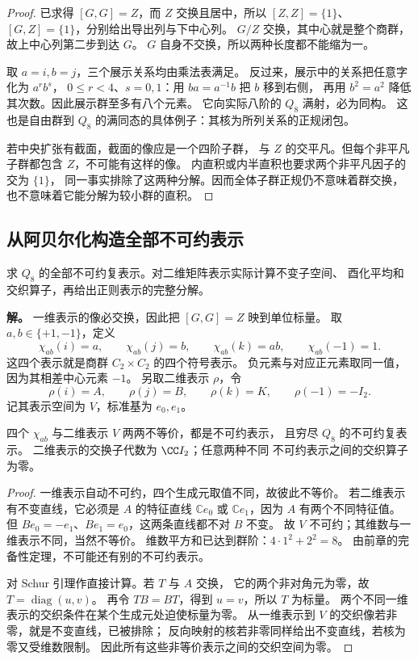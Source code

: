 \begin{proof}
已求得 $[G,G]=Z$，而 $Z$ 交换且居中，所以
$[Z,Z]=\{1\}$、$[G,Z]=\{1\}$，分别给出导出列与下中心列。
$G/Z$ 交换，其中心就是整个商群，故上中心列第二步到达 $G$。
$G$ 自身不交换，所以两种长度都不能缩为一。

取 $a=i,b=j$，三个展示关系均由乘法表满足。
反过来，展示中的关系把任意字化为 $a^r b^s$，
$0\le r<4$、$s=0,1$：用 $ba=a^{-1}b$ 把 $b$ 移到右侧，
再用 $b^2=a^2$ 降低其次数。因此展示群至多有八个元素。
它向实际八阶的 $Q_8$ 满射，必为同构。
这也是自由群到 $Q_8$ 的满同态的具体例子：其核为所列关系的正规闭包。

若中央扩张有截面，截面的像应是一个四阶子群，
与 $Z$ 的交平凡。但每个非平凡子群都包含 $Z$，不可能有这样的像。
内直积或内半直积也要求两个非平凡因子的交为 $\{1\}$，
同一事实排除了这两种分解。因而全体子群正规仍不意味着群交换，
也不意味着它能分解为较小群的直积。
\end{proof}

\subsection{从阿贝尔化构造全部不可约表示}

\begin{exbox}[把抽象乘法变成态空间上的矩阵]
求 $Q_8$ 的全部不可约复表示。对二维矩阵表示实际计算不变子空间、
酉化平均和交织算子，再给出正则表示的完整分解。
\end{exbox}

\textbf{解。} 一维表示的像必交换，因此把 $[G,G]=Z$ 映到单位标量。
取 $a,b\in\{+1,-1\}$，定义
\[
\chi_{ab}(i)=a,\qquad\chi_{ab}(j)=b,
\qquad\chi_{ab}(k)=ab,\qquad\chi_{ab}(-1)=1.
\]
这四个表示就是商群 $C_2\times C_2$ 的四个符号表示。
负元素与对应正元素取同一值，因为其相差中心元素 $-1$。
另取二维表示 $\rho$，令
\[
\rho(i)=A,\qquad\rho(j)=B,\qquad\rho(k)=K,
\qquad\rho(-1)=-I_2.
\]
记其表示空间为 $V$，标准基为 $e_0,e_1$。

\begin{proposition}
\label{prop:q8-all-irreps}
四个 $\chi_{ab}$ 与二维表示 $V$ 两两不等价，都是不可约表示，
且穷尽 $Q_8$ 的不可约复表示。
二维表示的交换子代数为 $\CC I_2$；任意两种不同
不可约表示之间的交织算子为零。
\end{proposition}

\begin{proof}
一维表示自动不可约，四个生成元取值不同，故彼此不等价。
若二维表示有不变直线，它必须是 $A$ 的特征直线
$\mathbb Ce_0$ 或 $\mathbb Ce_1$，因为 $A$ 有两个不同特征值。
但 $Be_0=-e_1$、$Be_1=e_0$，这两条直线都不对 $B$ 不变。
故 $V$ 不可约；其维数与一维表示不同，当然不等价。
维数平方和已达到群阶：$4\cdot1^2+2^2=8$。
由前章的完备性定理，不可能还有别的不可约表示。

对 Schur 引理作直接计算。若 $T$ 与 $A$ 交换，
它的两个非对角元为零，故 $T=\operatorname{diag}(u,v)$。
再令 $TB=BT$，得到 $u=v$，所以 $T$ 为标量。
两个不同一维表示的交织条件在某个生成元处迫使标量为零。
从一维表示到 $V$ 的交织像若非零，就是不变直线，已被排除；
反向映射的核若非零同样给出不变直线，若核为零又受维数限制。
因此所有这些非等价表示之间的交织空间为零。
\end{proof}

